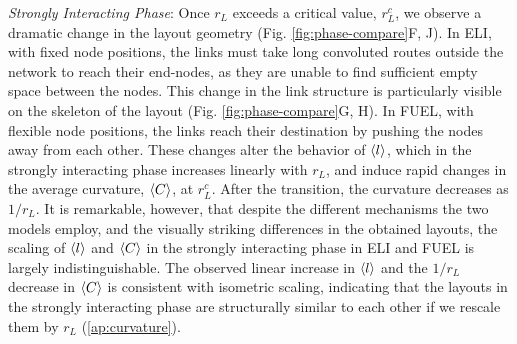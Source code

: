 \documentclass[nofootinbib,preprint,floatfix,titlepage,superscriptaddress]{revtex4} %
\newcommand{\outNim}[1]{}
\begin{document}
{\em Strongly Interacting Phase}: Once  $r_L$ exceeds a critical value, $r_L^c$, we observe a dramatic change in the layout geometry (Fig. \ref{fig:phase-compare}F, J). 
In ELI, with fixed node positions, the links must take long convoluted routes outside the network to reach their end-nodes, as they are unable to find sufficient empty space between the nodes.  
This change in the link structure is particularly visible on the skeleton of the layout (Fig. \ref{fig:phase-compare}G, H).
In FUEL, with flexible node positions, the links reach their destination by pushing the nodes away from each other. 
These changes alter the behavior of $\left<l\right>$, which in the strongly interacting phase increases linearly with $r_L$,  
and induce rapid changes in the average curvature, $\left<C\right>$,  at $r^c_L$. %
After the transition, the curvature decreases as $1/r_L$. 
It is remarkable, however, that despite the different mechanisms the two models employ, and the visually striking differences in the obtained layouts, the scaling of $\left<l\right>$ and $\left<C\right>$ in the strongly interacting phase in ELI and FUEL is largely indistinguishable. 
The observed linear increase in $\left<l\right>$ and the $1/r_L$ decrease in $\left<C\right>$ is consistent with isometric scaling, indicating that the layouts in the strongly interacting phase are structurally similar to each other if we rescale them by $r_L$ %
(\ref{ap:curvature}). 
\outNim{ %
The existence of a phase transition at $r_c$ is also signalled by
the relaxation time, representing the characteristic time the simulations needs to find an equilibrium solution. The strong peak for FUEL near $r_L^c$ (Fig. \ref{fig:phase-compare}D)
documents a critical slowing down typically observed in systems undergoing a second order phase transition.} 
\end{document}
